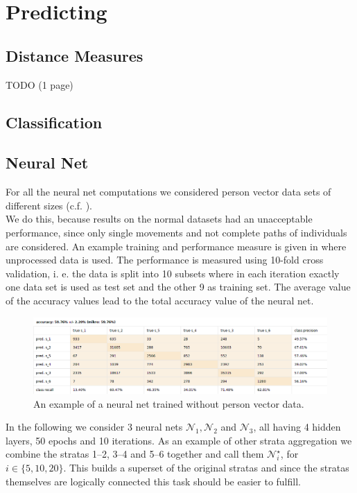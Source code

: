 \documentclass[runningheads]{llncs}
\begin{document}
	\section{Predicting}
	
	\subsection{Distance Measures}
	TODO (1 page)
	
	\subsection{Classification}
	
	\subsection{Neural Net}
	For all the neural net computations we considered person vector data sets of different sizes (c.f. ).\\
	
	We do this, because results on the normal datasets had an unacceptable performance, since only single movements and not complete paths of individuals are considered. An example training and performance measure is given in  where unprocessed data is used. The performance is measured using 10-fold cross validation, i. e. the data is split into 10 subsets where in each iteration exactly one data set is used as test set and the other 9 as training set. The average value of the accuracy values lead
	to the total accuracy value of the neural net.
	\begin{figure}[H]
		\centering
		\includegraphics[scale = 0.4]{src/pic/NN_without_vector.png}
		\caption{An example of a neural net trained without person vector data.}
		\label{fig: NN without vector}
	\end{figure}
	
	In the following we consider 3 neural nets $\mathcal{N}_1,\mathcal{N}_2$ and $\mathcal{N}_3$, all having 4 hidden layers, 50 epochs and 10 iterations.	
	As an example of other strata aggregation we combine the stratas 1--2, 3--4 and 5--6 together and call them $\mathcal{N}_i^\star$, for $i \in \{5,10,20\}$. This builds a superset of the original stratas and since the stratas themselves are logically connected this task should be easier to fulfill.\\
	
\end{document}
